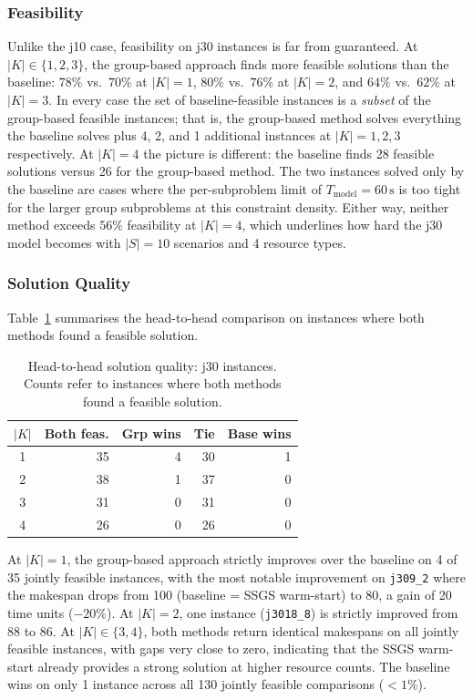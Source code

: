 \subsubsection*{Feasibility}
Unlike the j10 case, feasibility on j30 instances is far from
guaranteed. At $|K| \in \{1,2,3\}$, the group-based approach
finds more feasible solutions than the baseline:
$78\%$ vs.\ $70\%$ at $|K|=1$, $80\%$ vs.\ $76\%$ at $|K|=2$,
and $64\%$ vs.\ $62\%$ at $|K|=3$. In every case the set of
baseline-feasible instances is a \emph{subset} of the
group-based feasible instances; that is, the group-based
method solves everything the baseline solves plus 4, 2, and 1
additional instances at $|K|=1,2,3$ respectively.
At $|K|=4$ the picture is different: the baseline finds 28
feasible solutions versus 26 for the group-based method. The
two instances solved only by the baseline are cases where the
per-subproblem limit of $T_{\mathrm{model}}=60\,\text{s}$ is
too tight for the larger group subproblems at this constraint
density. Either way, neither method exceeds $56\%$ feasibility
at $|K|=4$, which underlines how hard the j30 model becomes
with $|S|=10$ scenarios and 4 resource types.
\subsubsection*{Solution Quality}
Table~\ref{tab:j30_headtohead} summarises the head-to-head
comparison on instances where both methods found a feasible
solution.
\begin{table}[htbp]
\centering
\renewcommand{\arraystretch}{1.35}
\caption{Head-to-head solution quality: j30 instances.
         Counts refer to instances where both methods found a
         feasible solution.}
\label{tab:j30_headtohead}
\begin{tabular}{c r r r r}
\hline
$|K|$ &
\textbf{Both feas.} &
\textbf{Grp wins} &
\textbf{Tie} &
\textbf{Base wins} \\
\hline
1 & 35 & 4 & 30 & 1 \\
2 & 38 & 1 & 37 & 0 \\
3 & 31 & 0 & 31 & 0 \\
4 & 26 & 0 & 26 & 0 \\
\hline
\end{tabular}
\end{table}
At $|K|=1$, the group-based approach strictly improves over the
baseline on 4 of 35 jointly feasible instances, with the most
notable improvement on \texttt{j309\_2} where the makespan drops
from 100 (baseline = SSGS warm-start) to 80, a gain of 20
time units ($-20\%$). At $|K|=2$, one instance
(\texttt{j3018\_8}) is strictly improved from 88 to 86.
At $|K| \in \{3,4\}$, both methods return identical makespans on
all jointly feasible instances, with gaps very close to zero,
indicating that the SSGS warm-start already provides a strong
solution at higher resource counts. The baseline wins on only 1
instance across all 130 jointly feasible comparisons ($<1\%$).
